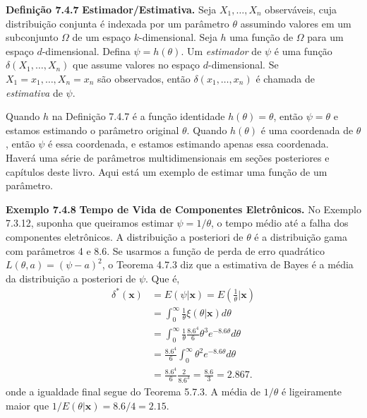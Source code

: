 \vspace{1cm}
\noindent\textbf{Definição 7.4.7} \quad \textbf{Estimador/Estimativa.} Seja $X_1, \dots, X_n$ observáveis, cuja distribuição conjunta é indexada por um parâmetro $\theta$ assumindo valores em um subconjunto $\Omega$ de um espaço $k$-dimensional. Seja $h$ uma função de $\Omega$ para um espaço $d$-dimensional. Defina $\psi = h(\theta)$. Um \textit{estimador} de $\psi$ é uma função $\delta(X_1, \dots, X_n)$ que assume valores no espaço $d$-dimensional. Se $X_1=x_1, \dots, X_n=x_n$ são observados, então $\delta(x_1, \dots, x_n)$ é chamada de \textit{estimativa} de $\psi$.

\vspace{1cm}
Quando $h$ na Definição 7.4.7 é a função identidade $h(\theta)=\theta$, então $\psi=\theta$ e estamos estimando o parâmetro original $\theta$. Quando $h(\theta)$ é uma coordenada de $\theta$, então $\psi$ é essa coordenada, e estamos estimando apenas essa coordenada.
Haverá uma série de parâmetros multidimensionais em seções posteriores e capítulos deste livro. Aqui está um exemplo de estimar uma função de um parâmetro.

\vspace{1cm}
\noindent\textbf{Exemplo 7.4.8} \quad \textbf{Tempo de Vida de Componentes Eletrônicos.} No Exemplo 7.3.12, suponha que queiramos estimar $\psi=1/\theta$, o tempo médio até a falha dos componentes eletrônicos. A distribuição a posteriori de $\theta$ é a distribuição gama com parâmetros 4 e 8.6. Se usarmos a função de perda de erro quadrático $L(\theta, a)=(\psi-a)^2$, o Teorema 4.7.3 diz que a estimativa de Bayes é a média da distribuição a posteriori de $\psi$. Que é,
\begin{align*}
\delta^*(\mathbf{x}) &= E(\psi|\mathbf{x}) = E\left(\frac{1}{\theta}\bigg|\mathbf{x}\right) \\
&= \int_0^{\infty}\frac{1}{\theta}\xi(\theta|\mathbf{x})d\theta \\
&= \int_0^{\infty}\frac{1}{\theta}\frac{8.6^4}{6}\theta^3 e^{-8.6\theta}d\theta \\
&= \frac{8.6^4}{6}\int_0^{\infty}\theta^2 e^{-8.6\theta}d\theta \\
&= \frac{8.6^4}{6}\frac{2}{8.6^3} = \frac{8.6}{3}=2.867.
\end{align*}
onde a igualdade final segue do Teorema 5.7.3. A média de $1/\theta$ é ligeiramente maior que $1/E(\theta|\mathbf{x}) = 8.6/4 = 2.15$.

